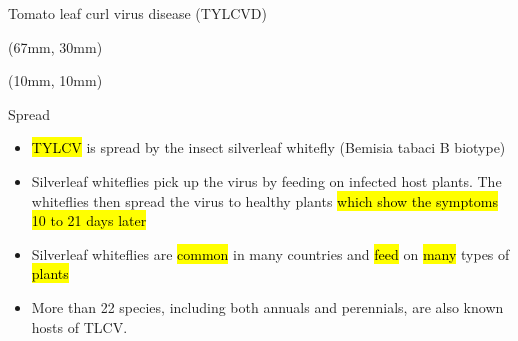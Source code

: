 \begin{frame}{Tomato leaf curl virus disease (TYLCVD)}
    \begin{textblock*}{60mm}(67mm, 30mm)
    \end{textblock*}
    \begin{textblock*}{55mm}(10mm, 10mm)
        \begin{greenbox}{Spread}
            \begin{itemize}[<+->]
                \item
                    \hl{TYLCV} is spread by the insect 
                    silverleaf whitefly (Bemisia tabaci 
                    B biotype)
                \item
                    Silverleaf whiteflies pick up the 
                    virus by feeding on infected host 
                    plants. The whiteflies then 
                    spread the virus to healthy plants 
                    \hl{ which show the symptoms 
                    10 to 21 days later}
                \item
                    Silverleaf whiteflies are 
                    \hl{common} in many countries and 
                    \hl{feed} on \hl{many} types of 
                    \hl{plants}
                \item
                    More than 22 species,
                    including both annuals and perennials, are also
                    known hosts of TLCV.
            \end{itemize}
        \end{greenbox}
    \end{textblock*}
\end{frame}
